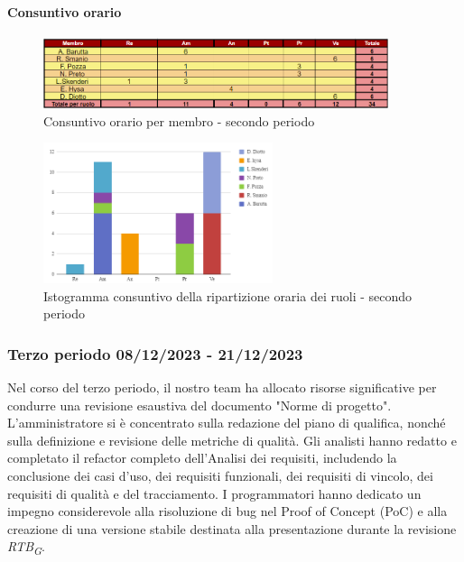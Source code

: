 \paragraph*{Consuntivo orario } \hspace{1pt}

\begin{figure}[H]
    \centering
    \includegraphics[width=0.9\textwidth]{../Images/consuntivoOrario2Periodo.png}
    \caption{Consuntivo orario per membro - secondo periodo}
    \label{fig:Constuntivo_orario_2}
\end{figure}

\begin{figure}[H]
    \centering
    \includegraphics[width=0.6\textwidth]{../Images/consuntivoDivisioneRuoli2Periodo.png}
    \caption{Istogramma consuntivo della ripartizione oraria dei ruoli - secondo periodo}
    \label{fig:Consuntivo_ripartizione_oraria_2}
\end{figure}




\subsubsection{Terzo periodo  08/12/2023 - 21/12/2023}
Nel corso del terzo periodo, il nostro team ha allocato risorse significative per condurre una revisione esaustiva del documento "Norme di progetto". L'amministratore si è concentrato sulla redazione del piano di qualifica, nonché sulla definizione e revisione delle metriche di qualità. Gli analisti hanno redatto e completato il refactor completo dell'Analisi dei requisiti, includendo la conclusione dei casi d'uso, dei requisiti funzionali, dei requisiti di vincolo, dei requisiti di qualità e del tracciamento. I programmatori hanno dedicato un impegno considerevole alla risoluzione di bug nel Proof of Concept (PoC) e alla creazione di una versione stabile destinata alla presentazione durante la revisione \textit{RTB}\textsubscript{\textit{G}}.

